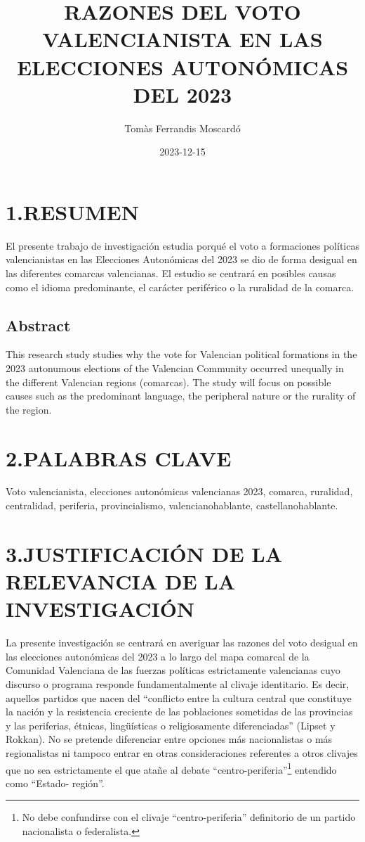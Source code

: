 \documentclass[
]{article}
\title{RAZONES DEL VOTO VALENCIANISTA EN LAS ELECCIONES AUTONÓMICAS DEL
2023}
\author{Tomàs Ferrandis Moscardó}
\date{2023-12-15}
\begin{document}
\maketitle

{
\setcounter{tocdepth}{2}
\tableofcontents
}
\hypertarget{resumen}{%
\section{1.RESUMEN}\label{resumen}}

El presente trabajo de investigación estudia porqué el voto a
formaciones políticas valencianistas en las Elecciones Autonómicas del
2023 se dio de forma desigual en las diferentes comarcas valencianas. El
estudio se centrará en posibles causas como el idioma predominante, el
carácter periférico o la ruralidad de la comarca.

\hypertarget{abstract}{%
\subsection{Abstract}\label{abstract}}

This research study studies why the vote for Valencian political
formations in the 2023 autonumous elections of the Valencian Community
occurred unequally in the different Valencian regions (comarcas). The
study will focus on possible causes such as the predominant language,
the peripheral nature or the rurality of the region.

\hypertarget{palabras-clave}{%
\section{2.PALABRAS CLAVE}\label{palabras-clave}}

Voto valencianista, elecciones autonómicas valencianas 2023, comarca,
ruralidad, centralidad, periferia, provincialismo, valencianohablante,
castellanohablante.

\hypertarget{justificaciuxf3n-de-la-relevancia-de-la-investigaciuxf3n}{%
\section{3.JUSTIFICACIÓN DE LA RELEVANCIA DE LA
INVESTIGACIÓN}\label{justificaciuxf3n-de-la-relevancia-de-la-investigaciuxf3n}}

La presente investigación se centrará en averiguar las razones del voto
desigual en las elecciones autonómicas del 2023 a lo largo del mapa
comarcal de la Comunidad Valenciana de las fuerzas políticas
estrictamente valencianas cuyo discurso o programa responde
fundamentalmente al clivaje identitario. Es decir, aquellos partidos que
nacen del ``conflicto entre la cultura central que constituye la nación
y la resistencia creciente de las poblaciones sometidas de las
provincias y las periferias, étnicas, lingüísticas o religiosamente
diferenciadas'' (Lipset y Rokkan). No se pretende diferenciar entre
opciones más nacionalistas o más regionalistas ni tampoco entrar en
otras consideraciones referentes a otros clivajes que no sea
estrictamente el que atañe al debate ``centro-periferia''\footnote{No
  debe confundirse con el clivaje ``centro-periferia'' definitorio de un
  partido nacionalista o federalista.} entendido como ``Estado-
región''.
\end{document}
